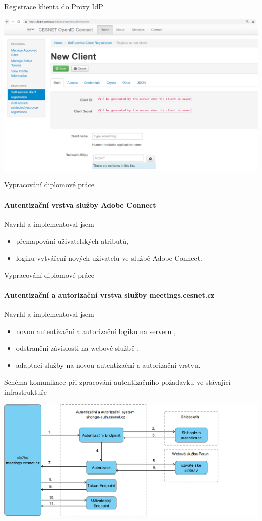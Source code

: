\documentclass[
]{beamer}
\begin{document}
\begin{frame}{Registrace klienta do Proxy IdP}

\includegraphics[width=\textwidth]{pics/oidcRegistration}
\end{frame}

\begin{frame}{Vypracování diplomové práce}
\framesubtitle{Autentizační vrstva služby Adobe Connect}
Navrhl a implementoval jsem
\begin{itemize}
    \item přemapování uživatelských atributů,
    \item logiku vytváření nových uživatelů ve službě Adobe Connect.
\end{itemize}
\end{frame}

\begin{frame}{Vypracování diplomové práce}
\framesubtitle{Autentizační a autorizační vrstva služby meetings.cesnet.cz}
Navrhl a implementoval jsem
\begin{itemize}
    \item novou autentizační a autorizační logiku na serveru ,
    \item odstranění závislosti na webové službě  \cite{perunPresentation},
    \item adaptaci služby  na novou autentizační a autorizační vrstvu.
\end{itemize}
\end{frame}

\begin{frame}{Schéma komunikace při zpracování autentizačního požadavku ve stávající infrastruktuře}

\includegraphics[width=\textwidth]{pics/meetings-perun-obhajoba.png}
\end{frame}
\end{document}
